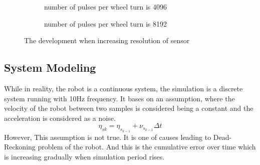 \documentclass[letterpaper,12pt]{article}
\begin{document}
\begin{figure}[H]
    \centering
    \begin{subfigure}[b]{8.cm}
        \centering
        \captionsetup{justification=centering}
        \caption{number of pulses per wheel turn is 4096}
        \label{fig:kermit}
    \end{subfigure}
    \begin{subfigure}[b]{8.cm}
        \centering
        \captionsetup{justification=centering}
        \caption{number of pulses per wheel turn is 8192}
        \label{fig:rana}
    \end{subfigure}
\caption{The development when increasing resolution of sensor}
\label{fig:map4_3}
\end{figure}
\subsection{System Modeling}
\setcounter{figure}{0}  
While in reality, the robot is a continuous system, the simulation is a discrete system running with 10Hz frequency. It bases on an assumption, where the velocity of the robot between two samples is considered being a constant and the acceleration is considered as a noise. 
\begin{equation}
\label{eq:4.1}
\eta_{sk} = \eta_{s_{k-1}} + \nu_{s_{k-1}} \Delta t
\end{equation}
However, This assumption is not true. It is one of causes leading to Dead-Reckoning problem of the robot. And this is the cumulative error over time which is increasing gradually when simulation period rises. 
\end{document}
